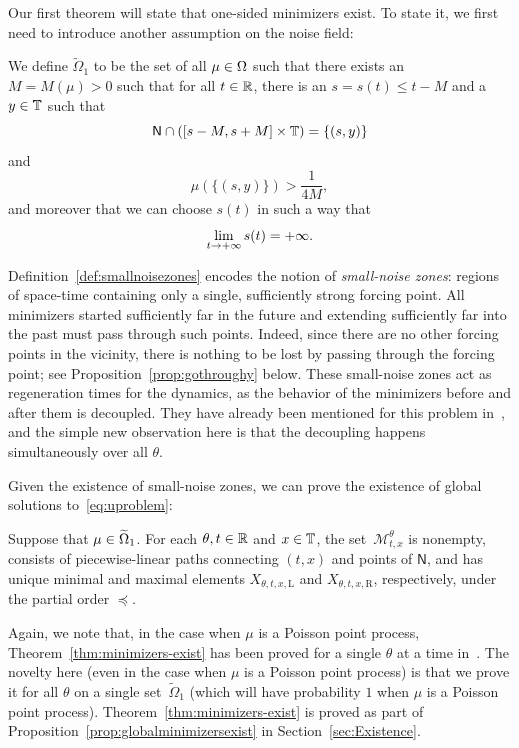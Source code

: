 \documentclass[AHL,Unicode,longabstracts]{cedram}
\newcounter{setofcase}
\newcounter{case}[setofcase]
\newcommand*\ssN{\mathsf{N}}
\newcommand*\scM{\mathscr{M}}
\newcommand*\TT{\mathbb{T}}
\newcommand*\RR{\mathbb{R}}
\newcommand*\Left{\mathrm{L}}
\newcommand*\Right{\mathrm{R}}
\renewcommand*{\to}{\mathchoice{\longrightarrow}{\rightarrow}{\rightarrow}{\rightarrow}}
\let\oldin\in
\renewcommand{\in}{\mathchoice{\oldin}{\oldin}{\,\oldin\,}{\,\oldin\,}}
\let\oldcap\cap
\renewcommand{\cap}{\mathchoice{\oldcap}{\oldcap}{\,\oldcap\,}{\,\oldcap\,}}
\newcommand*\TT{\mathbb{T}}
\newcommand*\RR{\mathbb{R}}
\begin{document}
Our first theorem will state that one-sided minimizers exist. To state it, we first need to introduce another assumption on the noise field:
\begin{defi}\label{def:smallnoisezones}
We define $\widetilde{\Omega}_{1}$ to be the set of all $\mu\in\Omega$ such that there exists an $M=M(\mu)>0$ such that for all $t\in\RR$, there is an $s=s(t)\le t-M$ and a $y\in\TT$ such that
\begin{equation}\label{eq:intersectiononly}
\ssN\cap([s-M,s+M]\times\TT)=\{(s,y)\}
\end{equation}
and
\begin{equation}\label{eq:youshouldtake}
\mu(\{(s,y)\})>\frac{1}{4M},
\end{equation}
and moreover that we can choose $s(t)$ in such a way that
\begin{equation}\label{eq:stttoinfty}
\lim_{t\to+\infty}s(t)=+\infty.
\end{equation}
\end{defi}

Definition~\ref{def:smallnoisezones} encodes the notion of \emph{small-noise zones}: regions of space-time containing only a single, sufficiently strong forcing point. All minimizers started sufficiently far in the future and extending sufficiently far into the past must pass through such points. Indeed, since there are no other forcing points in the vicinity,\pagebreak{} there is nothing to be lost by passing through the forcing point; see Proposition~\ref{prop:gothroughy} below. These small-noise zones act as regeneration times for the dynamics, as the behavior of the minimizers before and after them is decoupled. They have already been mentioned for this problem in~\cite{Bak13}, and the simple new observation here is that the decoupling happens simultaneously over all $\theta$.

Given the existence of small-noise zones, we can prove the existence of global solutions to~\eqref{eq:uproblem}:

\begin{theo}\label{thm:minimizers-exist}
Suppose that $\mu\in\widetilde{\Omega}_{1}$. For each $\theta,t\in\RR$ and $x\in\TT$, the set~$\scM_{t,x}^{\theta}$ is nonempty, consists of piecewise-linear paths connecting $(t,x)$ and points of $\ssN$, and has unique minimal and maximal elements $X_{\theta,t,x,\Left}$ and $X_{\theta,t,x,\Right}$, respectively, under the partial order $\preccurlyeq$.
\end{theo}

Again, we note that, in the case when $\mu$ is a Poisson point process,
Theorem~\ref{thm:minimizers-exist} has been proved for a single $\theta$ at a time in~\cite{Bak13}. The novelty here (even in the case when $\mu$ is a Poisson point process) is that we prove it for all $\theta$ on a single set~$\widetilde{\Omega}_{1}$ (which will have probability $1$ when $\mu$ is a Poisson point process). Theorem~\ref{thm:minimizers-exist} is proved as part of Proposition~\ref{prop:globalminimizersexist} in Section~\ref{sec:Existence}.
\end{document}

